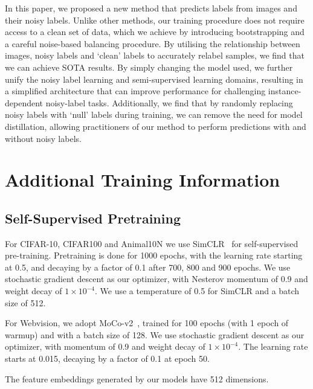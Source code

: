 \documentclass[10pt,twocolumn,letterpaper]{article}
\begin{document}
In this paper, we proposed a new method that predicts labels from images and their noisy labels. Unlike other methods, our training procedure does not require access to a clean set of data, which we achieve by introducing bootstrapping and a careful noise-based balancing procedure. By utilising the relationship between images, noisy labels and `clean' labels to accurately relabel samples, we find that we can achieve SOTA results. By simply changing the model used, we further unify the noisy label learning and semi-supervised learning domains, resulting in a simplified architecture that can improve performance for challenging instance-dependent noisy-label tasks. Additionally, we find that by randomly replacing noisy labels with `null' labels during training, we can remove the need for model distillation, allowing practitioners of our method to perform predictions with and without noisy labels. 

\clearpage

{\small


}

\clearpage

\appendix

\section{Additional Training Information}

\subsection{Self-Supervised Pretraining}

For CIFAR-10, CIFAR100 and Animal10N we use SimCLR~\cite{chen2020simple} for self-supervised pre-training. Pretraining is done for 1000 epochs, with the learning rate starting at 0.5, and decaying by a factor of 0.1 after 700, 800 and 900 epochs. We use stochastic gradient descent as our optimizer, with Nesterov momentum of 0.9 and weight decay of $1 \times 10^{-4}$. We use a temperature of 0.5 for SimCLR and a batch size of 512.

For Webvision, we adopt MoCo-v2~\cite{chen2020improved}, trained for 100 epochs (with 1 epoch of warmup) and with a batch size of 128. We use stochastic gradient descent as our optimizer, with momentum of 0.9 and weight decay of $1 \times 10^{-4}$. The learning rate starts at 0.015, decaying by a factor of 0.1 at epoch 50.

The feature embeddings generated by our models have 512 dimensions.
\end{document}
